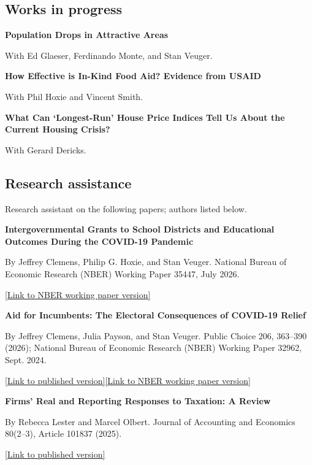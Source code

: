 \documentclass[10pt,letterpaper]{article}
\begin{document}
\subsection*{Works in progress}
\textbf{Population Drops in Attractive Areas}\par
With Ed Glaeser, Ferdinando Monte, and Stan Veuger. \par\vspace{2pt}
\textbf{How Effective is In-Kind Food Aid? Evidence from USAID}\par
With Phil Hoxie and Vincent Smith. \par\vspace{2pt}
\textbf{What Can `Longest-Run' House Price Indices Tell Us About the Current Housing Crisis?}\par
With Gerard Dericks. \par\vspace{2pt}

\subsection*{Research assistance}
{\small Research assistant on the following papers; authors listed below.}\par
{}\textbf{Intergovernmental Grants to School Districts and Educational Outcomes During the COVID-19 Pandemic}\par
By Jeffrey Clemens, Philip G. Hoxie, and Stan Veuger. {\small National Bureau of Economic Research (NBER) Working Paper 35447, July 2026.} \par{\small \href{https://www.nber.org/papers/w35447}{[Link to NBER working paper version]}} \par\vspace{2pt}
\textbf{Aid for Incumbents: The Electoral Consequences of COVID-19 Relief}\par
By Jeffrey Clemens, Julia Payson, and Stan Veuger. {\small Public Choice 206, 363--390 (2026); National Bureau of Economic Research (NBER) Working Paper 32962, Sept. 2024.} \par{\small \href{https://doi.org/10.1007/s11127-025-01326-w}{[Link to published version]}\quad \href{https://www.nber.org/papers/w32962}{[Link to NBER working paper version]}} \par\vspace{2pt}
\textbf{Firms' Real and Reporting Responses to Taxation: A Review}\par
By Rebecca Lester and Marcel Olbert. {\small Journal of Accounting and Economics 80(2--3), Article 101837 (2025).} \par{\small \href{https://doi.org/10.1016/j.jacceco.2025.101837}{[Link to published version]}} \par\vspace{2pt}
\endgroup
\end{document}
